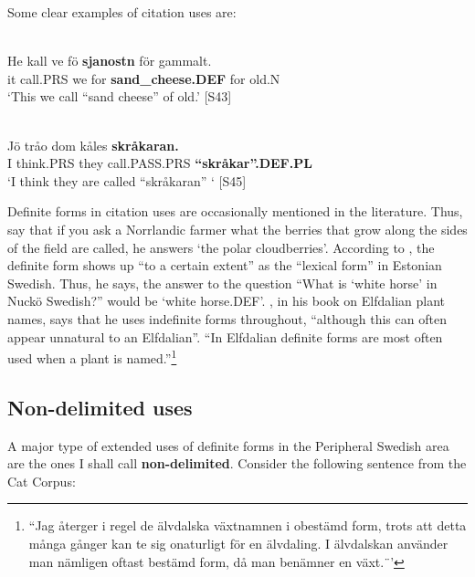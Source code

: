 Some clear examples of citation uses are:

\ea \label{} 
\\
\gll 	He  kall  ve  fö  \textbf{sjanostn} för  gammalt.\\
		it  call.PRS  we  for  \textbf{sand\_cheese.DEF} for  old.N\\
\glt 	‘This we call “sand cheese” of old.’ [S43]

\z

\ea \label{} 
\\
\gll Jö  tråo  dom  kåles  \textbf{skråkaran.}\\
I  think.PRS  they  call.PASS.PRS  \textbf{“skråkar”.DEF.PL}\\
\glt ‘I think they are called “skråkaran” ‘ [S45]

\z

Definite forms in citation uses are occasionally mentioned in the literature. Thus, \citet[282]{ÅgrenEtAl1954} say that if you ask a Norrlandic farmer what the berries that grow along the sides of the field are called, he answers  ‘the polar cloudberries’. According to \citet[82]{Lagman1979}, the definite form shows up “to a certain extent” as the “lexical form” in Estonian Swedish. Thus, he says, the answer to the question “What is ‘white horse’ in Nuckö Swedish?” would be  ‘white horse.DEF’. \citet[8]{Steensland1994}, in his book on Elfdalian plant names, says that he uses indefinite forms throughout, “although this can often appear unnatural to an Elfdalian”.  “In Elfdalian definite forms are most often used when a plant is named.”\footnote{ “Jag återger i regel de älvdalska växtnamnen i obestämd form, trots att detta många gånger kan te sig onaturligt för en älvdaling. I älvdalskan använder man nämligen oftast bestämd form, då man benämner en växt.¨’}

\subsection{ Non-delimited uses}
\label{bkm:Ref105226557}

A major type of extended uses of definite forms in the Peripheral Swedish area are the ones I shall call \textbf{non-delimited}. Consider the following sentence from the Cat Corpus: 

